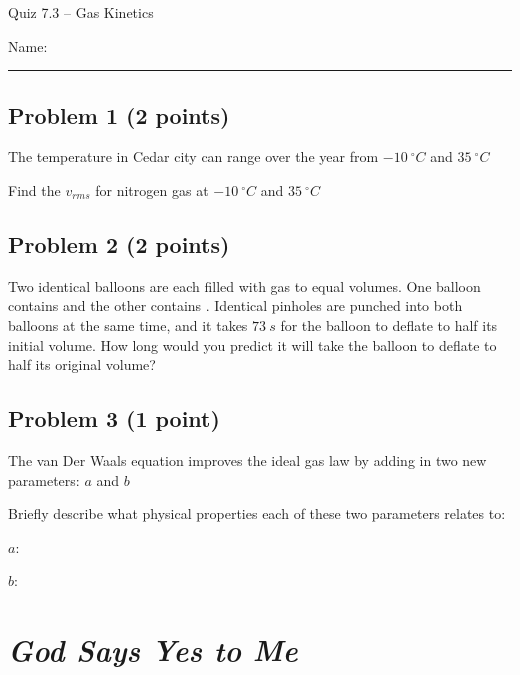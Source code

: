 \documentclass[11pt, letterpaper]{memoir}
\begin{document}
	\begin{center}
		{\large	Quiz 7.3 -- Gas Kinetics}
	\end{center}
{\large Name: \rule[-1mm]{4in}{.1pt}
	
	\subsection*{Problem 1 (2 points)}
	The temperature in Cedar city can range over the year from $-10~^\circ C$ and $35~^\circ C$
	
	\noindent Find the $v_{rms}$ for nitrogen gas at $-10~^\circ C$ and $35~^\circ C$
	
	\vspace{10em}
	\subsection*{Problem 2 (2 points)}
	Two identical balloons are each filled with gas to equal volumes. One balloon contains  and the other contains . Identical pinholes are punched into both balloons at the same time, and it takes $73~s$ for the  balloon to deflate to half its initial volume. How long would you predict it will take the  balloon to deflate to half its original volume?
	
	\vspace{10em}
	\subsection*{Problem 3 (1 point)}
	The van Der Waals equation improves the ideal gas law by adding in two new parameters: $a$ and $b$
	
	\noindent Briefly describe what physical properties each of these two parameters relates to:
	
	\vspace{1em}
	$a$:
	
	\vspace{3em}
	$b$:

\newpage
\pagestyle{empty}
\addtocounter{page}{-1}
\section*{\emph{God Says Yes to Me}}
}
\end{document}

